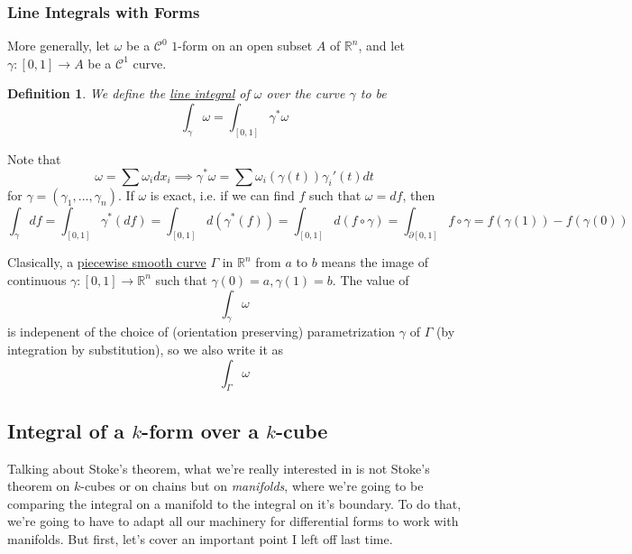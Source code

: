 \documentclass{article}
\newtheorem{definition}{Definition}
\newcommand{\reals}[0]{\mathbb{R}}
\newcommand{\mc}[1]{\mathcal{#1}}
\begin{document}
\subsubsection{Line Integrals with Forms}

More generally, let \(\omega\) be a \(\mc{C}^0\) \(1\)-form on an open subset \(A\) of \(\reals^n\), and let \(\gamma: [0, 1] \to A\) be a \(\mc{C}^1\) curve.
\begin{definition}

We define the \underline{line integral} of \(\omega\) over the curve \(\gamma\) to be
\begin{equation}
  \int_{\gamma}\omega = \int_{[0, 1]}\gamma^*\omega
\end{equation}

\end{definition}
Note that
\begin{equation}
  \omega = \sum\omega_idx_i \implies \gamma^*\omega = \sum\omega_i(\gamma(t))\gamma_i'(t)dt
\end{equation}
for \(\gamma = (\gamma_1,...,\gamma_n)\). If \(\omega\) is exact, i.e.  if we can find \(f\) such that \(\omega = df\), then
\begin{equation}
  \int_\gamma df = \int_{[0, 1]}\gamma^*(df) = \int_{[0, 1]}d(\gamma^*(f)) = \int_{[0, 1]}d(f \circ \gamma) = \int_{\partial[0, 1]}f \circ \gamma = f(\gamma(1)) - f(\gamma(0))
\end{equation}

Clasically, a \underline{piecewise smooth curve} \(\Gamma\) in \(\reals^n\) from \(a\) to \(b\) means the image of continuous \(\gamma: [0, 1] \to \reals^n\) such that \(\gamma(0) = a, \gamma(1) = b\). The value of
\begin{equation}
  \int_\gamma\omega
\end{equation}
is indepenent of the choice of (orientation preserving) parametrization \(\gamma\) of \(\Gamma\) (by integration by substitution), so we also write it as
\begin{equation}
  \int_{\Gamma}\omega
\end{equation}

\subsection{Integral of a \(k\)-form over a \(k\)-cube}

Talking about Stoke's theorem, what we're really interested in is not Stoke's theorem on \(k\)-cubes or on chains but on \textit{manifolds}, where we're going to be comparing the integral on a manifold to the integral on it's boundary. To do that, we're going to have to adapt all our machinery for differential forms to work with manifolds. But first, let's cover an important point I left off last time.
\end{document}
